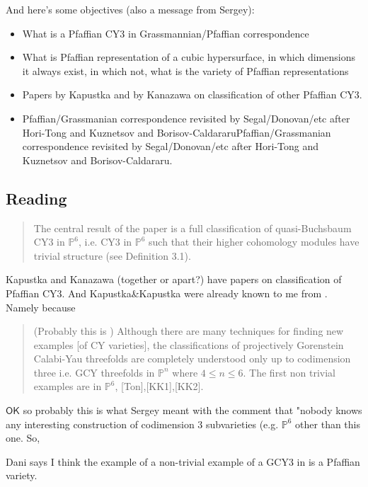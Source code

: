  And here's some objectives (also a message from Sergey):

\begin{itemize}
\item What is a Pfaffian CY3 in Grassmannian/Pfaffian correspondence
\item What is Pfaffian representation of a cubic hypersurface, in which dimensions it always exist, in which not, what is the variety of Pfaffian representations
\item Papers by Kapustka and by Kanazawa on classification of other Pfaffian CY3.
\item Pfaffian/Grassmanian correspondence revisited by Segal/Donovan/etc after Hori-Tong and Kuznetsov and Borisov-CaldararuPfaffian/Grassmanian correspondence revisited by Segal/Donovan/etc after Hori-Tong and Kuznetsov and Borisov-Caldararu.
\end{itemize}

\subsection{Reading \cite{kk1}}

{\color{2}\begin{quotation}
	The central result of the paper is a full classification of quasi-Buchsbaum CY3 in $\mathbb{P}^6$, i.e. CY3 in $\mathbb{P}^6$ such that their higher cohomology modules have trivial structure (see Definition 3.1).
\end{quotation}}

\vspace{1em}
Kapustka and Kanazawa (together or apart?) have papers on classification of Pfaffian CY3. And Kapustka\&Kapustka were already known to me from \cite{luk1}. Namely because

\begin{quotation}
		(Probably this is \cite{luk1}) Although there are many techniques for finding new examples [of CY varieties], the classifications of projectively Gorenstein Calabi-Yau threefolds are completely understood only up to codimension three i.e. GCY threefolds in $\mathbb{P}^n$ where $4\leq n\leq 6$. The first non trivial examples are in $\mathbb{P}^6$, [Ton],[KK1],[KK2].
\end{quotation}

$\mathsf{OK}$ so probably this is what Sergey meant with the comment that "{\color{3}nobody knows any interesting construction of codimension 3 subvarieties (e.g. $\mathbb{P}^6$ other than this one}. So,
\begin{thing8}{Dani says}\leavevmode
	{\color{8}I think the example of a non-trivial example of a GCY3 in \cite{kk1} is a Pfaffian variety.}
\end{thing8}

